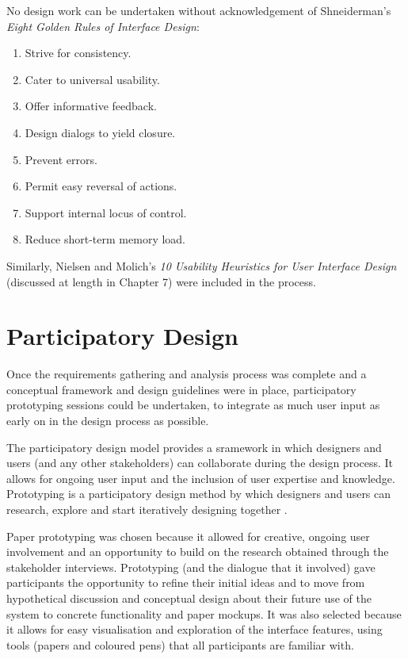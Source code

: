 No design work can be undertaken without acknowledgement of Shneiderman's \textit{Eight Golden Rules of Interface Design}\citep{ShneidermanPlaisant}:
\begin{enumerate}
 \item Strive for consistency.
 \item  Cater to universal usability.
 \item Offer informative feedback.
 \item Design dialogs to yield closure.
 \item Prevent errors.
 \item Permit easy reversal of actions.
 \item Support internal locus of control.
 \item Reduce short-term memory load.
\end{enumerate}
Similarly, Nielsen and Molich's \textit{10 Usability Heuristics for User Interface Design}\citep[p. 249]{NielsenHeuristics} (discussed at length in Chapter 7) were included in the process.

\section{Participatory Design}
Once the requirements gathering and analysis process was complete and a conceptual framework and design guidelines were in place, participatory prototyping sessions could be undertaken, to integrate as much user input as early on in the design process as possible. 

The participatory design model provides a sramework in which designers and users (and any other stakeholders) can collaborate during the design process. It allows for ongoing user input and the inclusion of user expertise and knowledge. Prototyping is a participatory design method by which designers and users can research, explore and start iteratively designing together \citep{Spinuzzi}.   

Paper prototyping was chosen because it allowed for creative, ongoing user involvement and an opportunity to build on the research obtained through the stakeholder interviews. Prototyping (and the dialogue that it involved) gave participants the opportunity to refine their initial ideas and to move from hypothetical discussion and conceptual design about their future use of the system to concrete functionality and paper mockups. It was also selected because it allows for easy visualisation and exploration of the interface features, using tools (papers and coloured pens) that all participants are familiar with\citep[p. 380]{HackosRedish}. 


